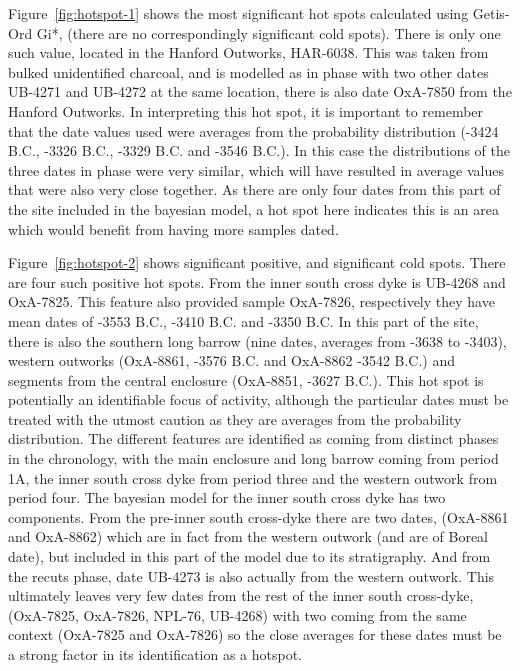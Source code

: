 Figure~\ref{fig:hotspot-1} shows the most significant hot spots calculated using Getis-Ord Gi*, (there are no correspondingly significant cold spots). There is only one such value, located in the Hanford Outworks, HAR-6038. This was taken from bulked unidentified charcoal, and is modelled as in phase with two other dates UB-4271 and UB-4272 at the same location, there is also date OxA-7850 from the Hanford Outworks. In interpreting this hot spot, it is important to remember that the date values used were averages from the probability distribution (-3424 B.C., -3326  B.C., -3329  B.C. and -3546  B.C.). In this case the distributions of the three dates in phase were very similar, which will have resulted in average values that were also very close together. As there are only four dates from this part of the site included in the bayesian model, a hot spot here indicates this is an area which would benefit from having more samples dated.

Figure~\ref{fig:hotspot-2} shows significant positive, and significant cold spots. There are four such positive hot spots. From the inner south cross dyke is UB-4268 and OxA-7825. This feature also provided sample OxA-7826, respectively they have mean dates of -3553  B.C., -3410  B.C. and -3350  B.C. In this part of the site, there is also the southern long barrow (nine dates, averages from -3638 to -3403), western outworks (OxA-8861, -3576 B.C. and OxA-8862 -3542 B.C.) and segments from the central enclosure (OxA-8851, -3627 B.C.). This hot spot is potentially an identifiable focus of activity, although the particular dates must be treated with the utmost caution as they are averages from the probability distribution. The different features are identified as coming from distinct phases in the chronology, with the main enclosure and long barrow coming from period 1A, the inner south cross dyke from period three and the western outwork from period four. The bayesian model for the inner south cross dyke has two components. From the pre-inner south cross-dyke there are two dates, (OxA-8861 and OxA-8862) which are in fact from the western outwork (and are of Boreal date), but included in this part of the model due to its stratigraphy. And from the recuts phase, date UB-4273 is also actually from the western outwork. This ultimately leaves very few dates from the rest of the inner south cross-dyke, (OxA-7825, OxA-7826, NPL-76, UB-4268) with two coming from the same context (OxA-7825 and OxA-7826) so the close averages for these dates must be a strong factor in its identification as a hotspot. 


